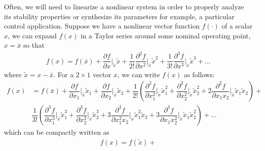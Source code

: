 Often, we will need to linearize a nonlinear system in order to properly analyze its stability properties or synthesize its parameters for example, a particular control application. Suppose we have a nonlinear vector function $f(\cdot)$ of a scalar $x$, we can expand $f(x)$ in a Taylor series around some nominal operating point, $x = \bar{x}$ so that 
%
\begin{align}
	f(x) = f(\bar{x}) + \dfrac{\partial f}{\partial x} \bigg\rvert_{\tilde{x}} \tilde{x}+ \dfrac{1}{2!} \dfrac{\partial^2f}{\partial x^2} \bigg\rvert_{\tilde{x}} \tilde{x}^2 + \dfrac{1}{3!} \dfrac{\partial^3f}{\partial x^3} \bigg\rvert_{\tilde{x}} \tilde{x}^3 +  \ldots
\end{align}
%
where $\tilde{x} = x - \bar{x}$. For a $2 \times 1$ vector $x$, we can write $f(x)$ as follows:
%
\begin{align}
	f(x) &= f(\bar{x}) + \dfrac{\partial f}{\partial x_1} \bigg\rvert_{\tilde{x}} \tilde{x}_1 + \dfrac{\partial f}{\partial x_2} \bigg\rvert_{\tilde{x}} \tilde{x}_2 + \dfrac{1}{2!} \left(\dfrac{\partial^2f}{\partial x_1^2} \bigg\rvert_{\tilde{x}} \tilde{x}_1^2 + \dfrac{\partial^2f}{\partial x_2^2} \bigg\rvert_{\tilde{x}} \tilde{x}_2^2 + 2 \dfrac{\partial ^2 f}{\partial x_1 x_2}\bigg \rvert_{\tilde{x}} \tilde{x}_1 \tilde{x}_2 \right) + \nonumber \\
	& 
	\dfrac{1}{3!} \left(\dfrac{\partial^3f}{\partial x_1^3} \bigg\rvert_{\tilde{x}} \tilde{x}_1^3 + \dfrac{\partial^3f}{\partial x_2^3} \bigg\rvert_{\tilde{x}} \tilde{x}_2^3 + 3 \dfrac{\partial ^3 f}{\partial x_1^2 x_2}\bigg \rvert_{\tilde{x}} \tilde{x}_1^2  \tilde{x}_2 + 3 \dfrac{\partial ^3 f}{\partial x_1 x_2^2}\bigg \rvert_{\tilde{x}} \tilde{x}_1  \tilde{x}_2^2  \right) + \ldots
\end{align}
 which can be compactly written as 
 \begin{align}
 	f(x) = f(\tilde{x}) + 
 \end{align}
